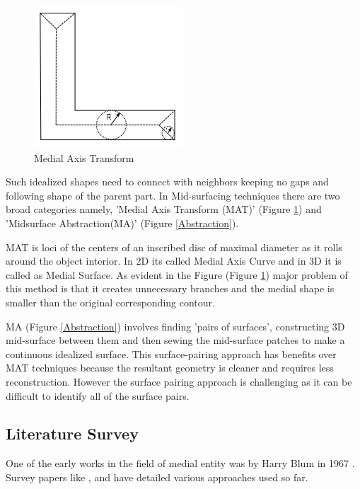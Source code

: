 	\begin{figure}
	\centering
	\vspace{-.6cm}
	\includegraphics[scale=0.65]{..//Common/images//MAT.png}
	\vspace{.2cm}
	\caption{Medial Axis Transform}
	\label{MAT}
	\vspace{-.5cm}
	\end{figure}

Such idealized shapes need to connect with neighbors keeping no gaps and following shape of the parent part. In Mid-surfacing techniques there are two broad categories namely, 'Medial Axis Transform (MAT)'   (Figure \ref{MAT}) and 'Midsurface Abstraction(MA)'   (Figure \ref{Abstraction}). 

MAT is  loci of the centers of an inscribed disc of maximal diameter as it rolls around the object interior.  In 2D its called Medial Axis Curve and in 3D it is called as Medial Surface. As evident in the Figure  (Figure \ref{MAT}) major problem of this method is that it creates unnecessary branches and the medial shape is smaller than the original corresponding contour. 

MA (Figure \ref{Abstraction}) involves finding  'pairs of surfaces', constructing 3D mid-surface between them and then sewing the mid-surface patches to make a continuous idealized surface. This surface-pairing approach has benefits over MAT techniques because the resultant geometry is cleaner and requires less reconstruction. However the surface pairing approach is challenging as it can be difficult to identify all of the surface pairs.

\subsection{Literature Survey}

One of the early works in the field of medial entity was by Harry Blum in 1967 \citep{Harry1967}. Survey papers like \citep{Attali2004}, \citep{Lam1992} and \citep{Yogesh2010, YogeshCOEP2013} have detailed various approaches used so far. 


